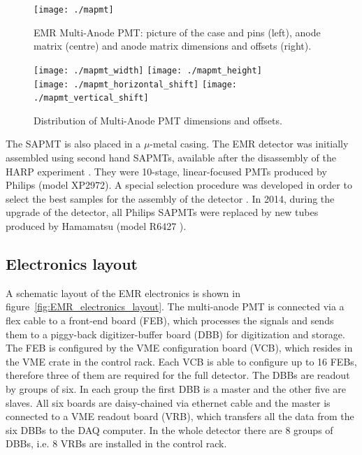 \documentclass[a4paper,11pt]{article}
\begin{document}
\begin{figure}[h]
 \centering
 \texttt{[image: ./mapmt]}
 \caption[Multi-Anode PMT]{EMR Multi-Anode PMT: picture of the case and pins (left), anode matrix (centre) and anode matrix dimensions and offsets (right).}
 \label{fig:mapmt}
\end{figure}

\begin{figure}[h]
 \centering
 \texttt{[image: ./mapmt\_width]}
 \texttt{[image: ./mapmt\_height]}\\
 \texttt{[image: ./mapmt\_horizontal\_shift]}
 \texttt{[image: ./mapmt\_vertical\_shift]}
 \caption[Distribution of Multi-Anode PMT dimensions]{Distribution of Multi-Anode PMT dimensions and offsets.}
 \label{fig:mapmt_dimensions}
\end{figure}

The SAPMT is also placed in a $\mu$-metal casing. The EMR detector was initially assembled
using second hand SAPMTs, available after the disassembly of the HARP experiment \cite{harp}. They were 10-stage, linear-focused PMTs produced
by Philips (model XP2972). A special selection procedure was developed in order to select the best samples for the assembly of the detector
\cite{philips}. In 2014, during the upgrade of the detector, all Philips SAPMTs were replaced by new tubes produced by Hamamatsu (model R6427
\cite{hamamatsu_mapmt}).

\subsection{Electronics layout}

A schematic layout of the EMR electronics is shown in figure~\ref{fig:EMR_electronics_layout}. The multi-anode PMT is connected via a flex cable
to a front-end board (FEB), which processes the signals and sends them to a piggy-back digitizer-buffer board (DBB) for digitization and storage.
The FEB is configured by the VME configuration board (VCB), which resides in the VME crate in the control rack. Each VCB is able to configure
up to 16 FEBs, therefore three of them are required for the full detector. The DBBs are readout by groups of six. In each group the first DBB
is a master and the other five are slaves. All six boards are daisy-chained via ethernet cable and the master is connected to a VME readout board
(VRB), which transfers all the data from the six DBBs to the DAQ computer. In the whole detector there are 8 groups of DBBs, i.e. 8 VRBs are
installed in the control rack. 
\end{document}
